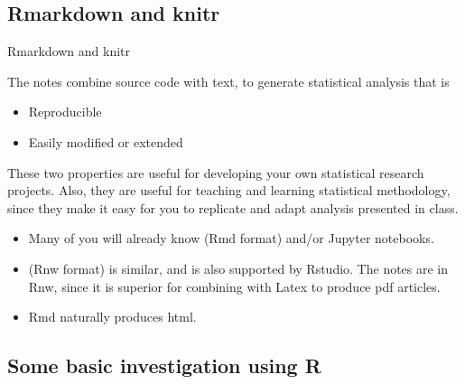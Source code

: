 \subsection{Rmarkdown and knitr}

\begin{frame}{Rmarkdown and knitr}

The notes combine source code with text, to generate statistical analysis that is 
\begin{itemize}
\item Reproducible
\item Easily modified or extended
\end{itemize}
These two properties are useful for developing your own statistical research projects. Also, they are useful for teaching and learning statistical methodology, since they make it easy for you to replicate and adapt analysis presented in class.


\begin{itemize}
\item Many of you will already know  (Rmd format) and/or Jupyter notebooks.
\item {} (Rnw format) is similar, and is also supported by Rstudio. The notes are in Rnw, since it is superior for combining with Latex to produce pdf articles.
\item Rmd naturally produces html.
\end{itemize}

\end{frame}

\subsection{Some basic investigation using R}

